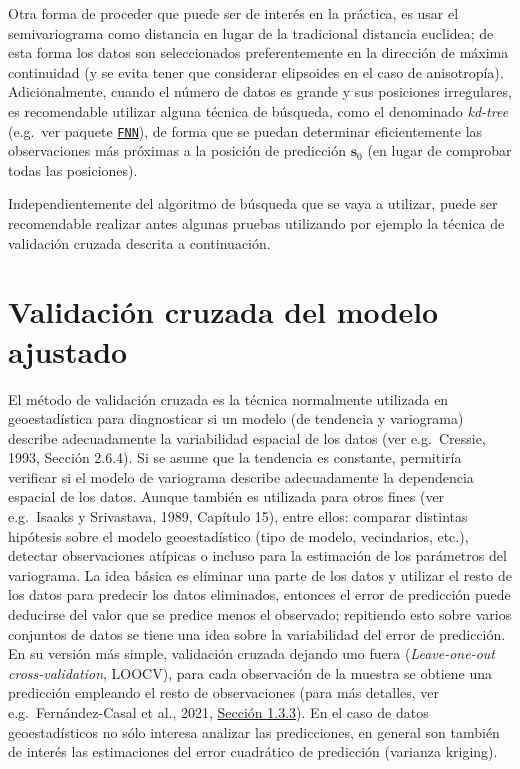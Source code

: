 \documentclass[
]{book}
\theoremstyle{break}
\theoremstyle{definition}
\theoremstyle{definition}
\theoremstyle{definition}
\theoremstyle{definition}
\theoremstyle{remark}
\begin{document}
Otra forma de proceder que puede ser de interés en la práctica, es usar el semivariograma como distancia en lugar de la tradicional distancia euclidea; de esta forma los datos son seleccionados preferentemente en la dirección de máxima continuidad (y se evita tener que considerar elipsoides en el caso de anisotropía).
Adicionalmente, cuando el número de datos es grande y sus posiciones irregulares, es recomendable utilizar alguna técnica de búsqueda, como el denominado \emph{kd-tree} (e.g.~ver paquete \href{https://CRAN.R-project.org/package=FNN}{\texttt{FNN}}), de forma que se puedan determinar eficientemente las observaciones más próximas a la posición de predicción \(\mathbf{s}_{0}\) (en lugar de comprobar todas las posiciones).

Independientemente del algoritmo de búsqueda que se vaya a utilizar, puede ser recomendable realizar antes algunas pruebas utilizando por ejemplo la técnica de validación cruzada descrita a continuación.

\section{Validación cruzada del modelo ajustado}\label{validacion-cruzada}

El método de validación cruzada es la técnica normalmente utilizada en geoestadística para diagnosticar si un modelo (de tendencia y variograma) describe adecuadamente la variabilidad espacial de los datos (ver e.g.~Cressie, 1993, Sección 2.6.4).
Si se asume que la tendencia es constante, permitiría verificar si el modelo de variograma describe adecuadamente la dependencia espacial de los datos.
Aunque también es utilizada para otros fines (ver e.g.~Isaaks y Srivastava, 1989, Capítulo 15), entre ellos: comparar distintas hipótesis sobre el modelo geoestadístico (tipo de modelo, vecindarios, etc.), detectar observaciones atípicas o incluso para la estimación de los parámetros del variograma.
La idea básica es eliminar una parte de los datos y utilizar el resto de los datos para predecir los datos eliminados, entonces el error de predicción puede deducirse del valor que se predice menos el observado; repitiendo esto sobre varios conjuntos de datos se tiene una idea sobre la variabilidad del error de predicción.
En su versión más simple, validación cruzada dejando uno fuera (\emph{Leave-one-out cross-validation}, LOOCV), para cada observación de la muestra se obtiene una predicción empleando el resto de observaciones (para más detalles, ver e.g.~Fernández-Casal et al., 2021, \href{https://rubenfcasal.github.io/aprendizaje_estadistico/const-eval.html\#cv}{Sección 1.3.3}).
En el caso de datos geoestadísticos no sólo interesa analizar las predicciones, en general son también de interés las estimaciones del error cuadrático de predicción (varianza kriging).
\end{document}
